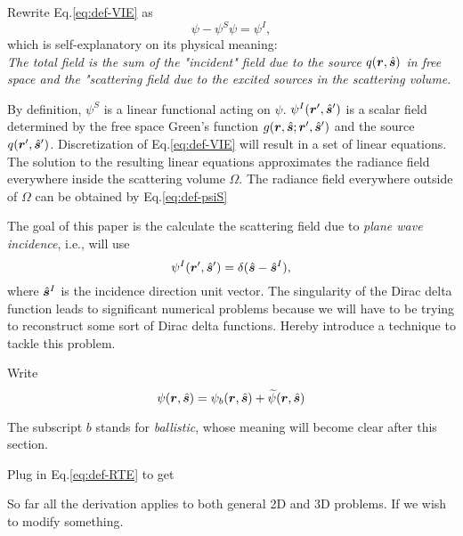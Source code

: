 \documentclass [12pt,letterpaper]{article}
\renewcommand{\vec}{\vectorsym}
\begin{document}
Rewrite Eq.\eqref{eq:def-VIE} as $$\psi-\psi^S\psi=\psi^I,$$ which is self-explanatory on its physical meaning: \\ \emph{The total field is the sum of the "incident" field due to the source $q(\vec{r},\hat{\vec{s}})$ in free space and the "scattering field due to the excited sources in the scattering volume}.

By definition, $\psi^S$ is a linear functional acting on $\psi$. $\psi^I(\vec{r}^\prime,\hat{\vec{s}}^\prime)$ is a scalar field determined by the free space Green's function $g(\vec{r},\hat{\vec{s}};\vec{r}^\prime,\hat{\vec{s}}^\prime)$ and the source $q(\vec{r}^\prime,\hat{\vec{s}}^\prime)$. Discretization of Eq.\eqref{eq:def-VIE} will result in a set of linear equations. The solution to the resulting linear equations approximates the radiance field everywhere inside the scattering volume $\Omega$. The radiance field everywhere outside of $\Omega$ can be obtained by Eq.\eqref{eq:def-psiS}

The goal of this paper is the calculate the scattering field due to \emph{plane wave incidence}, i.e., will use $$\psi^I(\vec{r}^\prime,\hat{\vec{s}}^\prime)=\delta(\hat{\vec{s}}-\hat{\vec{s}}^I),$$ where $\hat{\vec{s}}^I$ is the incidence direction unit vector. The singularity of the Dirac delta function leads to significant numerical problems because we will have to be trying to reconstruct some sort of Dirac delta functions. Hereby introduce a technique to tackle this problem.

Write
\begin{equation*}
    \psi(\vec{r},\hat{\vec{s}})=\psi_b(\vec{r},\hat{\vec{s}})+\widetilde{\psi}(\vec{r},\hat{\vec{s}})
\end{equation*}

The subscript $b$ stands for \emph{ballistic}, whose meaning will become clear after this section.

Plug in Eq.\eqref{eq:def-RTE} to get

%
%

So far all the derivation applies to both general 2D and 3D problems. 
If we wish to modify something.
\end{document}
